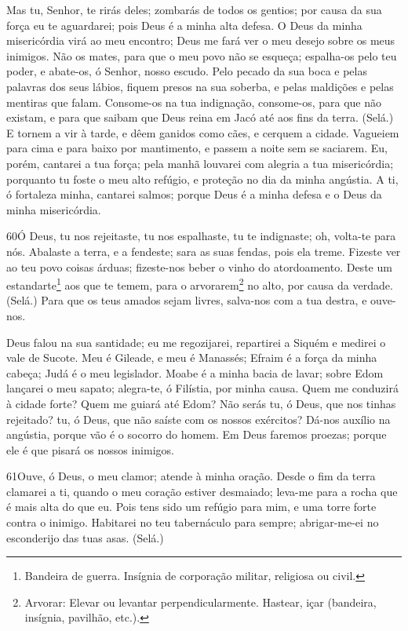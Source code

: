 Mas tu, Senhor, te rirás deles; zombarás de todos os gentios;
por causa da sua força eu te aguardarei; pois Deus é a minha
alta defesa. O Deus da minha misericórdia virá ao meu
encontro; Deus me fará ver o meu desejo sobre os meus inimigos.
Não os mates, para que o meu povo não se esqueça; espalha-os
pelo teu poder, e abate-os, ó Senhor, nosso escudo. Pelo
pecado da sua boca e pelas palavras dos seus lábios, fiquem presos
na sua soberba, e pelas maldições e pelas mentiras que falam.
Consome-os na tua indignação, consome-os, para que não
existam, e para que saibam que Deus reina em Jacó até aos fins da
terra. (Selá.)
 E tornem a vir à tarde, e dêem ganidos como cães, e cerquem a
cidade. Vagueiem para cima e para baixo por mantimento, e
passem a noite sem se saciarem. Eu, porém, cantarei a tua
força; pela manhã louvarei com alegria a tua misericórdia; porquanto
tu foste o meu alto refúgio, e proteção no dia da minha angústia.
A ti, ó fortaleza minha, cantarei salmos; porque Deus é a
minha defesa e o Deus da minha misericórdia.

\bigskip

\lettrine{60}{}Ó Deus, tu nos rejeitaste, tu nos espalhaste, tu
te indignaste; oh, volta-te para nós. Abalaste a terra, e a
fendeste; sara as suas fendas, pois ela treme. Fizeste ver ao
teu povo coisas árduas; fizeste-nos beber o vinho do atordoamento.
Deste um estandarte\footnote{Bandeira de guerra. Insígnia de
corporação militar, religiosa ou civil.} aos que te temem, para o
arvorarem\footnote{Arvorar: Elevar ou levantar perpendicularmente.
Hastear, içar (bandeira, insígnia, pavilhão, etc.).} no alto, por
causa da verdade. (Selá.) Para que os teus amados sejam livres,
salva-nos com a tua destra, e ouve-nos.

Deus falou na sua santidade; eu me regozijarei, repartirei a
Siquém e medirei o vale de Sucote. Meu é Gileade, e meu é
Manassés; Efraim é a força da minha cabeça; Judá é o meu legislador.
Moabe é a minha bacia de lavar; sobre Edom lançarei o meu
sapato; alegra-te, ó Filístia, por minha causa. Quem me
conduzirá à cidade forte? Quem me guiará até Edom? Não serás
tu, ó Deus, que nos tinhas rejeitado? tu, ó Deus, que não saíste com
os nossos exércitos? Dá-nos auxílio na angústia, porque vão é
o socorro do homem. Em Deus faremos proezas; porque ele é que
pisará os nossos inimigos.

\bigskip

\lettrine{61}{}Ouve, ó Deus, o meu clamor; atende à minha
oração. Desde o fim da terra clamarei a ti, quando o meu coração
estiver desmaiado; leva-me para a rocha que é mais alta do que eu.
Pois tens sido um refúgio para mim, e uma torre forte contra o
inimigo. Habitarei no teu tabernáculo para sempre; abrigar-me-ei
no esconderijo das tuas asas. (Selá.)

